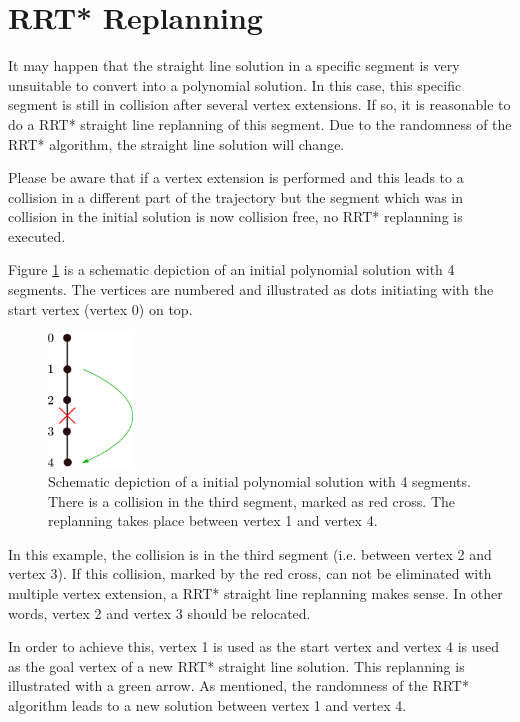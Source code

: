 \section{RRT* Replanning}\label{sec:replanningPassages}

It may happen that the straight line solution in a specific segment is very unsuitable to convert into a polynomial solution. In this case, this specific segment is still in collision after several vertex extensions. If so, it is reasonable to do a RRT* straight line replanning of this segment. Due to the randomness of the RRT* algorithm, the straight line solution will change. \newline

Please be aware that if a vertex extension is performed and this leads to a collision in a different part of the trajectory but the segment which was in collision in the initial solution is now collision free, no RRT* replanning is executed. \newline

Figure \ref{pic:vertexExtensionRRT} is a schematic depiction of an initial polynomial solution with 4 segments. The vertices are numbered and illustrated as dots initiating with the start vertex (vertex 0) on top. 
\begin{figure}[H]
   \centering
   \includegraphics[width=0.2\textwidth]{pics/vertexExtensionRRT.eps}
   \caption{Schematic depiction of a initial polynomial solution with 4 segments. There is a collision in the third segment, marked as red cross. The replanning takes place between vertex 1 and vertex 4.}
   \label{pic:vertexExtensionRRT}
\end{figure}

In this example, the collision is in the third segment (i.e. between vertex 2 and vertex 3). If this collision, marked by the red cross, can not be eliminated with multiple vertex extension, a RRT* straight line replanning makes sense. In other words, vertex 2 and vertex 3 should be relocated. 

In order to achieve this, vertex 1 is used as the start vertex and vertex 4 is used as the goal vertex of a new RRT* straight line solution. This replanning is illustrated with a green arrow. As mentioned, the randomness of the RRT* algorithm leads to a new solution between vertex 1 and vertex 4.





